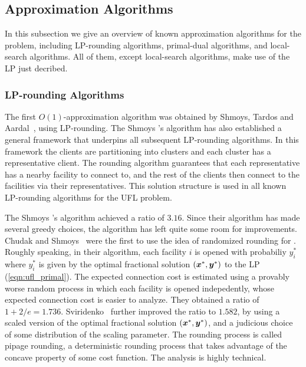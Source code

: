 \documentclass[oneside,final]{ucr}
\begin{document}
\subsection{Approximation Algorithms}
In this subsection we give an overview of known
approximation algorithms for the {\UFL} problem, including
LP-rounding algorithms, primal-dual algorithms, and
local-search algorithms. All of them, except local-search
algorithms, make use of the LP just decribed.

\subsubsection{LP-rounding Algorithms}
The first $O(1)$-approximation algorithm was obtained by
Shmoys, Tardos and Aardal~\cite{ShmoysTA97}, using
LP-rounding. The Shmoys {\etal}'s algorithm has also
established a general framework that underpins all
subsequent LP-rounding algorithms. In this framework the
clients are partitioning into clusters and each cluster has
a representative client. The rounding algorithm guarantees
that each representative has a nearby facility to connect
to, and the rest of the clients then connect to the
facilities via their representatives. This solution
structure is used in all known LP-rounding algorithms for
the UFL problem.

The Shmoys {\etal}'s algorithm achieved a ratio of
$3.16$. Since their algorithm has made several greedy
choices, the algorithm has left quite some room for
improvements. Chudak and Shmoys~\cite{ChudakS04} were the
first to use the idea of randomized rounding for
{\UFL}. Roughly speaking, in their algorithm, each facility
$i$ is opened with probabiliy $y_i^\ast$ where $y_i^\ast$ is
given by the optimal fractional solution
$(\boldsymbol{x}^\ast,\boldsymbol{y}^\ast)$ to the LP
(\ref{eqn:ufl_primal}). The expected connection cost is
estimated using a provably worse random process in which
each facility is opened indepedently, whose expected
connection cost is easier to analyze. They obtained a ratio
of $1+2/e = 1.736$. Sviridenko~\cite{Svi02} further improved
the ratio to $1.582$, by using a scaled version of the
optimal fractional solution $(\boldsymbol{x}^\ast,\boldsymbol{y}^\ast)$, and a
judicious choice of some distribution of the scaling
parameter. The rounding process is called pipage rounding, a
deterministic rounding process that takes advantage of the
concave property of some cost function. The analysis is
highly technical.
\end{document}
